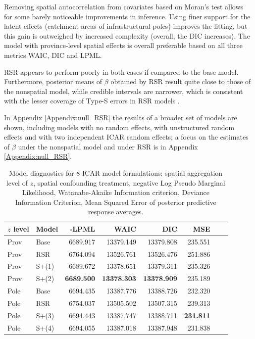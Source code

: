 \documentclass[openany, 11pt, oneside]{book}
\begin{document}
Removing spatial autocorrelation from covariates based on Moran's test allows for some barely noticeable improvements in inference. Using finer support for the latent effects (catchment areas of infrastructural poles) improves the fitting, but this gain is outweighed by increased complexity (overall, the DIC increases). The model with province-level spatial effects is overall preferable based on all three metrics WAIC, DIC and LPML.

RSR appears to perform poorly in both cases if compared to the base model. Furthermore, posterior means of $\beta$ obtained by RSR result quite close to those of the nonspatial model, while credible intervals are narrower, which is consistent with the lesser coverage of Type-S errors in RSR models \parencite{Khan}. 

In Appendix \ref{Appendix:null_RSR} the results of a broader set of models are shown, including models with no random effects, with unstructured random effects and with two independent ICAR random effects; a focus on the estimates of $\beta$ under the nonspatial model and under RSR is in Appendix \ref{Appendix:null_RSR}. 

\begin{table}[ht]
\centering
\begin{tabular}{llrrrrrr}
  \toprule
  $z$ level & Model & -LPML & WAIC & DIC & MSE \\ 
  \midrule
  Prov & Base &6689.917 & 13379.149 & 13379.808 & 235.551 \\ %
  Prov & RSR  &6764.094 & 13526.761 & 13526.476 & 251.886 \\ %
  Prov & S+(1)&6689.672 & 13378.651 & 13379.311 & 235.326 \\ %
  Prov & S+(2)&\textbf{6689.500} & \textbf{13378.303} & \textbf{13378.909} & 235.189 \\  \midrule %
  Pole & Base &6694.435 & 13387.776 & 13388.726 & 232.320 \\ %
  Pole & RSR  &6754.037 & 13505.502 & 13507.315 & 239.313 \\ %
  Pole & S+(3)&6694.443 & 13387.747 & 13388.711 & \textbf{231.811} \\ %
  Pole & S+(4)&6694.055 & 13387.018 & 13387.948 & 231.838 \\ %
   \bottomrule   
\end{tabular}
  \captionsetup{width=0.9\textwidth}
\caption{Model diagnostics for 8 ICAR model formulations: spatial aggregation level of $z$, spatial confounding treatment, negative Log Pseudo Marginal Likelihood, Watanabe-Akaike Information criterion, Deviance Information Criterion, Mean Squared Error of posterior predictive response averages.}
\label{tab:ICAR_diagnostics}
\end{table}
\end{document}
